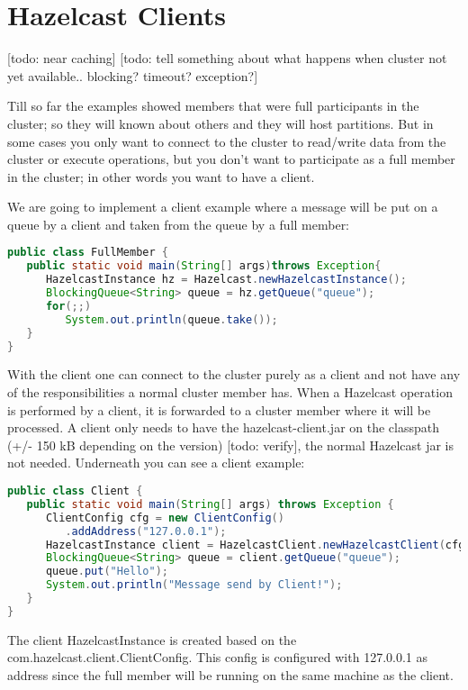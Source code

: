 \chapter{Hazelcast Clients}

[todo: near caching]
[todo: tell something about what happens when cluster not yet available.. blocking? timeout? exception?]

Till so far the examples showed members that were full participants in the cluster; so they will known about others and they will host partitions. But in some cases you only want to connect to the cluster to read/write data from the cluster or execute operations, but you don't want to participate as a full member in the cluster; in other words you want to have a client.

We are going to implement a client example where a message will be put on a queue by a client and taken from the queue by a full member:
\begin{lstlisting}[language=java]
public class FullMember {
   public static void main(String[] args)throws Exception{
      HazelcastInstance hz = Hazelcast.newHazelcastInstance();
      BlockingQueue<String> queue = hz.getQueue("queue");
      for(;;) 
         System.out.println(queue.take());
   }
}
\end{lstlisting}

With the client one can connect to the cluster purely as a client and not have any of the responsibilities a normal cluster member has. When a Hazelcast operation is performed by a client, it is forwarded to a cluster member where it will be processed. A client only needs to have the hazelcast-client.jar on the classpath (+/- 150 kB depending on the version) [todo: verify], the normal Hazelcast jar is not needed. Underneath you can see a client example:
\begin{lstlisting}[language=java]
public class Client {
   public static void main(String[] args) throws Exception {
      ClientConfig cfg = new ClientConfig()
         .addAddress("127.0.0.1");
      HazelcastInstance client = HazelcastClient.newHazelcastClient(cfg);
      BlockingQueue<String> queue = client.getQueue("queue");
      queue.put("Hello");
      System.out.println("Message send by Client!");
   }
}
\end{lstlisting}
The client HazelcastInstance is created based on the com.hazelcast.client.ClientConfig. This config is configured with 127.0.0.1 as address since the full member will be running on the same machine as the client.

